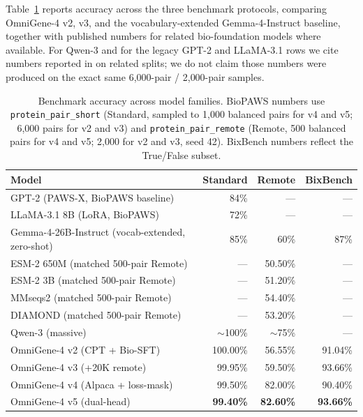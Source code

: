 \documentclass[11pt]{article}
\begin{document}
Table~\ref{tab:benchmarks} reports accuracy across the three benchmark protocols, comparing OmniGene-4 v2, v3, and the vocabulary-extended Gemma-4-Instruct baseline, together with published numbers for related bio-foundation models where available. For Qwen-3 and for the legacy GPT-2 and LLaMA-3.1 rows we cite numbers reported in \citep{wang2026biopaws} on related splits; we do not claim those numbers were produced on the exact same 6{,}000-pair / 2{,}000-pair samples.

\begin{table}[H]
\centering
\small
\caption{Benchmark accuracy across model families. BioPAWS numbers use \texttt{protein\_pair\_short} (Standard, sampled to 1{,}000 balanced pairs for v4 and v5; 6{,}000 pairs for v2 and v3) and \texttt{protein\_pair\_remote} (Remote, 500 balanced pairs for v4 and v5; 2{,}000 for v2 and v3, seed 42). BixBench numbers reflect the True/False subset.}
\label{tab:benchmarks}
\begin{tabular}{lrrr}
\toprule
\textbf{Model} & \textbf{Standard} & \textbf{Remote} & \textbf{BixBench} \\
\midrule
GPT-2 (PAWS-X, BioPAWS baseline)        & 84\%   & ---    & ---    \\
LLaMA-3.1 8B (LoRA, BioPAWS)            & 72\%   & ---    & ---    \\
Gemma-4-26B-Instruct (vocab-extended, zero-shot)  & 85\%   & 60\%   & 87\%   \\
ESM-2 650M (matched 500-pair Remote)    & ---    & 50.50\% & ---   \\
ESM-2 3B (matched 500-pair Remote)      & ---    & 51.20\% & ---   \\
MMseqs2 (matched 500-pair Remote)       & ---    & 54.40\% & ---   \\
DIAMOND (matched 500-pair Remote)       & ---    & 53.20\% & ---   \\
Qwen-3 (massive)                        & $\sim$100\% & $\sim$75\% & ---    \\
\midrule
OmniGene-4 v2 (CPT + Bio-SFT)           & 100.00\% & 56.55\% & 91.04\% \\
OmniGene-4 v3 (+20K remote)             &  99.95\% & 59.50\% & 93.66\% \\
OmniGene-4 v4 (Alpaca + loss-mask)      &  99.50\% & 82.00\% & 90.40\% \\
OmniGene-4 v5 (dual-head)               & \textbf{99.40\%} & \textbf{82.60\%} & \textbf{93.66\%} \\
\bottomrule
\end{tabular}
\end{table}
\end{document}
